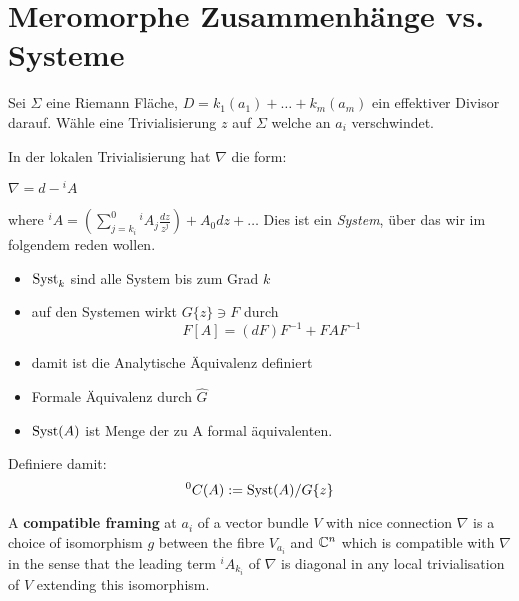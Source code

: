 \section{Meromorphe Zusammenhänge vs. Systeme}
Sei $\Sigma$ eine Riemann Fläche, $D=k_1(a_1)+\dots+k_m(a_m)$ ein effektiver
Divisor darauf.
Wähle eine Trivialisierung $z$ auf $\Sigma$ welche an $a_i$ verschwindet.
\begin{paracol}{2}
In der lokalen Trivialisierung hat $\nabla$ die form:
\end{paracol}
\begin{paracol}{2}
\begin{center}
$ \nabla=d-{}^iA $
\end{center}
where ${}^iA=\left(\sum^{0}_{j=k_i}{}^iA_j\frac{dz}{z^{j}}\right)+A_0dz+\dots$
\switchcolumn %
Dies ist ein \emph{System}, über das wir im folgendem reden wollen.

\begin{itemize}
\item $\operatorname{Syst}_k$ sind alle System bis zum Grad $k$
\item auf den Systemen wirkt $G\{z\}\ni F$ durch
\[F[A]=(dF)F^{-1}+FAF^{-1}\]
\item damit ist die Analytische Äquivalenz definiert
\item Formale Äquivalenz durch $\hat G$
\item $\operatorname{Syst}(A)$ ist Menge der zu A formal äquivalenten.
\end{itemize}
Definiere damit:
\[ {}^0C(A):=\operatorname{Syst}(A)/G\{z\} \]
\end{paracol}

\begin{paracol}{2}
\begin{defn}
\end{defn}
\switchcolumn %
\begin{defn}
\end{defn}
\end{paracol}

\begin{paracol}{2}
\begin{defn}
A \textbf{compatible framing} at $a_i$ of a vector bundle $V$ with nice
connection $\nabla$ is a choice of isomorphism $g$ between the fibre
$V_{a_i}$ and $\mathbb{C}^n$ which is compatible with $\nabla$ in the sense that the
leading term ${}^iA_{k_i}$ of $\nabla$ is diagonal in any local
trivialisation of $V$ extending this isomorphism.
\end{defn}
\switchcolumn %
\begin{defn}
\end{defn}
\end{paracol}
